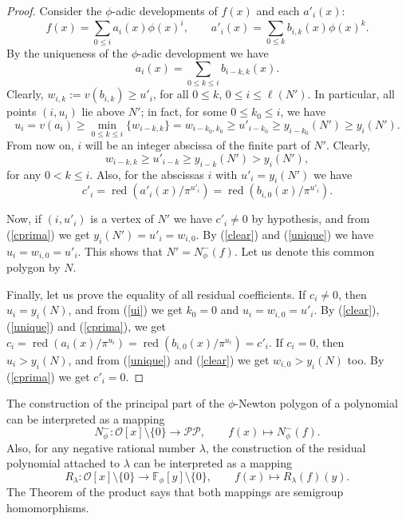 \documentclass{amsart}
\def\op{\operatorname}
\def\fph{\mathbb{F}_{\phi}}
\def\la{\lambda}
\def\lra{\longrightarrow}
\def\npp#1{N_{\phi}^-(#1)}
\def\oo{{\mathcal O}}
\def\pol{{\mathcal P}{\mathcal P}}
\def\rd{\op{red}}
\def\zpx{\oo[x]}
\begin{document}
\begin{proof}
Consider the $\phi$-adic developments of $f(x)$ and each $a'_i(x)$:
$$
f(x)=\sum_{0\le i}a_i(x)\phi(x)^i,\qquad a'_i(x)=\sum_{0\le k}b_{i,k}(x)\phi(x)^k.
$$
By the uniqueness of the $\phi$-adic development we have
\begin{equation}\label{unique}
a_i(x)=\sum_{0\le k\le i}b_{i-k,k}(x).
\end{equation}
Clearly, $w_{i,k}:=v(b_{i,k})\ge u'_i$, for all $0\le k$, $0\le i\le \ell(N')$. In particular, all points $(i,u_i)$ lie above $N'$; in fact, for some $0\le k_0\le i$, we have
\begin{equation}\label{ui}
u_i=v(a_i)\ge \min_{0\le k\le i}\{w_{i-k,k}\}=w_{i-k_0,k_0}\ge u'_{i-k_0}\ge y_{i-k_0}(N')\ge  y_i(N').
\end{equation}
From now on, $i$ will be an integer abscissa of the finite part of $N'$. Clearly, 
\begin{equation}\label{clear}
 w_{i-k,k}\ge u'_{i-k}\ge y_{i-k}(N')>y_i(N'),
\end{equation}
for any $0<k\le i$. Also, for the abscissas $i$ with $u'_i=y_i(N')$ we have 
\begin{equation}\label{cprima}
c'_i=\rd(a'_i(x)/\pi^{u'_i})=\rd(b_{i,0}(x)/\pi^{u'_i}).
\end{equation}

Now, if $(i,u'_i)$ is a vertex of $N'$ we have $c'_i\ne0$ by hypothesis, and from (\ref{cprima}) 
we get $y_i(N')=u'_i=w_{i,0}$. By (\ref{clear}) and (\ref{unique}) we have $u_i=w_{i,0}=u'_i$. This shows that $N'=\npp{f}$. Let us denote this common polygon by $N$.

Finally, let us prove the equality of all residual coefficients. If $c_i\ne0$, then $u_i=y_i(N)$, and from (\ref{ui}) we get $k_0=0$ and $u_i=w_{i,0}=u'_i$. By (\ref{clear}), (\ref{unique}) and  (\ref{cprima}), we get $c_i=\rd(a_i(x)/\pi^{u_i})=\rd(b_{i,0}(x)/\pi^{u_i})=c'_i$.
If $c_i=0$, then $u_i>y_i(N)$, and from (\ref{unique}) and (\ref{clear}) we get $w_{i,0}>y_i(N)$ too. By (\ref{cprima}) we get  $c'_i=0$.
\end{proof}

The construction of the principal part of the $\phi$-Newton polygon of a polynomial can be
interpreted as a mapping
$$
N_{\phi}^-\colon \zpx\setminus\{0\}\lra \pol,\qquad f(x)\mapsto \npp{f}.
$$
Also, for any negative rational number $\la$, the construction of the residual polynomial attached to $\la$  can be
interpreted as a mapping
$$
R_{\la}\colon \zpx\setminus\{0\}\lra \fph[y]\setminus\{0\},\qquad f(x)\mapsto R_{\la}(f)(y).
$$  
The Theorem of the product says that both mappings are semigroup
homomorphisms.
\end{document}

